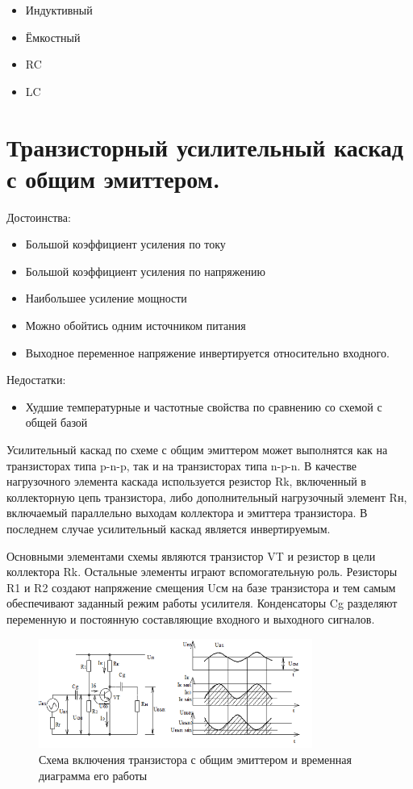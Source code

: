 \documentclass[unicode, 12pt, a4paper, oneside]{article}
\begin{document}
\begin{itemize}
\item Индуктивный
\item Ёмкостный
\item RC
\item LC
\end{itemize}


\section{Транзисторный усилительный каскад с общим эмиттером.}

Достоинства:

\begin{itemize}
\item Большой коэффициент усиления по току
\item Большой коэффициент усиления по напряжению
\item Наибольшее усиление мощности
\item Можно обойтись одним источником питания
\item Выходное переменное напряжение инвертируется относительно входного.
\end{itemize}

Недостатки:

\begin{itemize}
\item Худшие температурные и частотные свойства по сравнению со схемой с общей базой
\end{itemize}

Усилительный каскад по схеме с общим эмиттером может выполнятся как на транзисторах типа p-n-p, так и на транзисторах типа n-p-n. В качестве нагрузочного элемента каскада используется резистор Rk, включенный в коллекторную цепь транзистора, либо дополнительный нагрузочный элемент Rн, включаемый параллельно выходам коллектора и эмиттера транзистора. В последнем случае усилительный каскад является инвертируемым.

Основными элементами схемы являются транзистор VT и резистор в цели коллектора Rk. Остальные элементы играют вспомогательную роль. Резисторы R1 и R2 создают напряжение смещения Uсм на базе транзистора и тем самым обеспечивают заданный режим работы усилителя. Конденсаторы Cg разделяют переменную и постоянную составляющие входного и выходного сигналов.

\begin{figure}[H]
\centering
\includegraphics[width=0.8\textwidth]{20_OE.png}
\caption{Схема включения транзистора с общим эмиттером и временная диаграмма его работы}
\label{fig:20_OE}
\end{figure}
\end{document}

